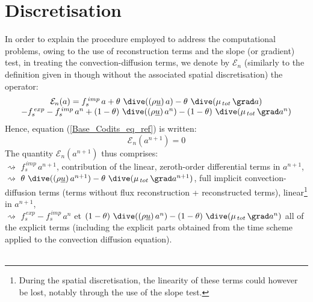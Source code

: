 \section*{Discretisation}
In order to explain the procedure employed to address the computational
problems, owing to the use of reconstruction terms and the slope (or gradient)
test, in treating the convection-diffusion terms, we denote by $\mathcal{E}_{n}$
(similarly to the definition given in  though without the associated spatial discretisation)
the operator:
\begin{equation}\label{Base_Codits_Eq_ref_small}
\begin{array}{c}
\mathcal{E}_{n}(a) = f_s^{\,imp}\,a + \theta\,\, \dive((\rho
\underline{u})\,a) - \theta\,\, \dive(\mu_{\,tot}\,\grad a)\\
- f_s^{\,exp} -  f_s^{\,imp}\,a^{n} +(1-\theta)\,\,\dive((\rho
\underline{u})\, a^n) - (1-\theta)\,\, \dive(\mu_{\,tot}\,\grad a^n)
\end{array}
\end{equation}
Hence, equation (\ref{Base_Codits_eq_ref}) is written:
\begin{equation}
\mathcal{E}_{n}(a^{n+1}) = 0
\end{equation}
The quantity  $\mathcal{E}_{n}(a^{n+1})$ thus comprises:\\
\hspace*{1.cm} $\rightsquigarrow$ $f_s^{\,imp}\,a^{n+1}$, contribution of the linear, zeroth-order
differential terms in $a^{n+1}$,\\
\hspace*{1.cm} $\rightsquigarrow$ $\theta\,\,
\dive((\rho\underline{u})\,a^{n+1})
- \theta\,\, \dive(\mu_{\,tot}\,\grad a^{n+1})$, full implicit convection-diffusion terms
(terms without flux reconstruction + reconstructed terms),
linear\footnote{During the spatial discretisation, the linearity of these terms
could however be lost, notably through the use of the slope test.}
in $a^{n+1}$,\\
\hspace*{1.cm} $\rightsquigarrow$ $f_s^{\,exp}- f_s^{\,imp}\,a^n$ et
$(1-\theta)\,\,\dive((\rho
\underline{u})\,a^n) - (1-\theta)\,\, \dive(\mu_{\,tot}\,\grad a^n)$ all of the
explicit terms (including the explicit parts obtained from the time scheme
applied to the convection diffusion equation).\\\\

